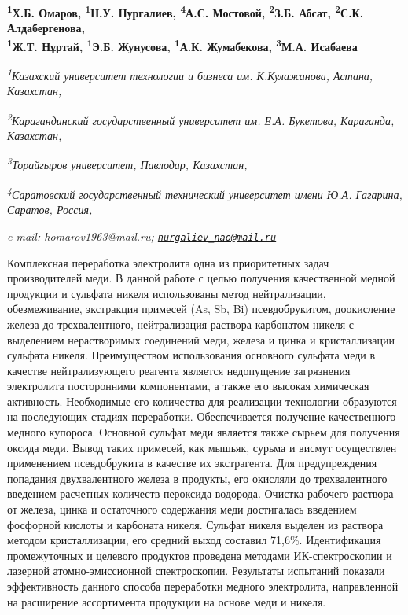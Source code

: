 {\bfseries \textsuperscript{1}Х.Б. Омаров\textsuperscript{\envelope },
\textsuperscript{1}Н.У. Нургалиев\textsuperscript{\envelope },
\textsuperscript{4}А.С. Мостовой, \textsuperscript{2}З.Б. Абсат,
\textsuperscript{2}С.К. Алдабергенова,\\
\textsuperscript{1}Ж.Т. Нұртай, \textsuperscript{1}Э.Б. Жунусова,
\textsuperscript{1}А.К. Жумабекова, \textsuperscript{3}М.А. Исабаева}

\emph{\textsuperscript{1}Казахский университет технологии и бизнеса им.
К.Кулажанова, Астана, Казахстан,}

\emph{\textsuperscript{2}Карагандинский государственный университет им.
Е.А. Букетова, Караганда, Казахстан,}

\emph{\textsuperscript{3}Торайгыров университет, Павлодар, Казахстан,}

\emph{\textsuperscript{4}Саратовский государственный технический
университет имени Ю.А. Гагарина, Саратов, Россия,}

\emph{e-mail: homarov1963@mail.ru;
\href{mailto:nurgaliev_nao@mail.ru}{\nolinkurl{nurgaliev\_nao@mail.ru}}}

Комплексная переработка электролита одна из приоритетных задач
производителей меди. В данной работе с целью получения качественной
медной продукции и сульфата никеля использованы метод нейтрализации,
обезмеживание, экстракция примесей (As, Sb, Bi) псевдобрукитом,
доокисление железа до трехвалентного, нейтрализация раствора карбонатом
никеля с выделением нерастворимых соединений меди, железа и цинка и
кристаллизации сульфата никеля. Преимуществом использования основного
сульфата меди в качестве нейтрализующего реагента является недопущение
загрязнения электролита посторонними компонентами, а также его высокая
химическая активность. Необходимые его количества для реализации
технологии образуются на последующих стадиях переработки. Обеспечивается
получение качественного медного купороса. Основной сульфат меди является
также сырьем для получения оксида меди. Вывод таких примесей, как
мышьяк, сурьма и висмут осуществлен применением псевдобрукита в качестве
их экстрагента. Для предупреждения попадания двухвалентного железа в
продукты, его окисляли до трехвалентного введением расчетных количеств
пероксида водорода. Очистка рабочего раствора от железа, цинка и
остаточного содержания меди достигалась введением фосфорной кислоты и
карбоната никеля. Сульфат никеля выделен из раствора методом
кристаллизации, его средний выход составил 71,6\%. Идентификация
промежуточных и целевого продуктов проведена методами ИК-спектроскопии и
лазерной атомно-эмиссионной спектроскопии. Результаты испытаний показали
эффективность данного способа переработки медного электролита,
направленной на расширение ассортимента продукции на основе меди и
никеля.

